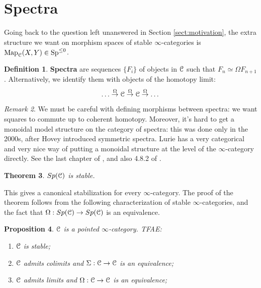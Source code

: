 \documentclass[10pt,a4paper,reqno,oneside]{book} %
\theoremstyle{plain}
\newtheorem{thm}{Theorem}[section]
\newtheorem{prop}[thm]{Proposition}
\theoremstyle{definition}
\newtheorem{defin}[thm]{Definition}
\theoremstyle{remark}
\newtheorem{rem}[thm]{Remark}
\numberwithin{equation}{section}
\begin{document}
\section{Spectra}
\label{sect:spectra}

Going back to the question left unanswered in Section \ref{sect:motivation}, the extra structure we want on
morphism spaces of stable $\infty$-categories is $\operatorname{Map}_{\mathcal C}(X,Y) \in \operatorname{Sp}^{\leq 0}$.

\begin{defin}
\textbf{Spectra} are sequences $\{F_i\}$ of objects in $\mathcal C$ such that $F_n \simeq \Omega F_{n+1}$. Alternatively,
we identify them with objects of the homotopy limit:
\[	\dots \overset{\Omega}{\to} \mathcal C \overset{\Omega}{\to} \mathcal C \overset{\Omega}{\to} \dots	\]
\end{defin}

\begin{rem}
We must be careful with defining morphisms between spectra: we want squares to commute up to coherent homotopy.
Moreover, it's hard to get a monoidal model structure on the category of spectra: this was done only in the 2000s, after Hovey 
introduced symmetric spectra. Lurie has a very categorical and very nice way of putting a monoidal structure 
at the level of the $\infty$-category
directly. See the last chapter of \cite{groth}, and also 4.8.2 of \cite{Lurie_Higher_algebra}.
\end{rem}

\begin{thm}
$Sp(\mathcal C)$ is stable.
\end{thm}

This gives a canonical stabilization for every $\infty$-category. The proof of the theorem follows from the following characterization
of stable $\infty$-categories,
and the fact that $\Omega:Sp(\mathcal C) \to Sp(\mathcal C)$ is an equivalence.

\begin{prop}
\label{prop:stable_shift}
$\mathcal C$ is a pointed $\infty$-category. TFAE:
\begin{enumerate}
\item $\mathcal C$ is stable;
\item $\mathcal C$ admits colimits and $\Sigma : \mathcal C \to \mathcal C$ is an equivalence;
\item $\mathcal C$ admits limits and $\Omega : \mathcal C \to \mathcal C$ is an equivalence;
\end{enumerate}
\end{prop}
\end{document}
